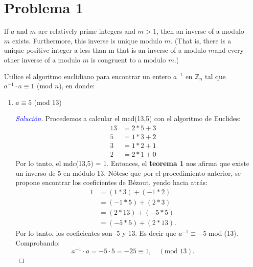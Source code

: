 \documentclass[a4paper,12pt]{article}
\newenvironment{solution}
  {\renewcommand\qedsymbol{$\square$}\begin{proof}[\textcolor{blue}{Solución}]}
  {\end{proof}}
\begin{document}
\section{Problema 1}
\begin{tcolorbox}[colback=gray!15,colframe=black!1!black,title=Teorema 1 - Sección 4.4 de \cite{rosen2012discrete}]
	If $a$ and $m$ are relatively prime integers and $m > 1$, then an inverse of a modulo $m$ exists. Furthermore, this inverse is unique modulo $m$. (That is, there is a unique positive integer a less than m that is an inverse of a modulo $m $and every other inverse of a modulo $m$ is congruent to a modulo $m$.)
	\end{tcolorbox}
Utilice el algoritmo euclidiano para encontrar un entero $a^{-1}$ en $\mathbb{Z}_n$ tal que $a^{-1}\cdot a \equiv 1$ (mod $n$), en donde:
\begin{enumerate}
	\item $a\equiv 5$ (mod 13) 
	\begin{solution}
		Procedemos a calcular el mcd(13,5) con el algoritmo de Euclides: 
		\begin{align*}
			13 &= 2*5+3\\
			5  &= 1*3 + 2\\ 
			3  &= 1*2 +1\\
			2 &= 2*1+0
		\end{align*}
	Por lo tanto, el mdc(13,5) = 1. Entonces, el \textbf{teorema 1} nos afirma que existe un inverso de 5 en módulo 13. Nótese que por el procedimiento anterior, se propone encontrar los coeficientes de Bézout, yendo hacia atrás:
\begin{align*}
	1	&=	(1 * 3) + (-1 * 2)\\
	&=	(-1 * 5) + (2 * 3)\\
	& =	(2 * 13) + (-5 * 5)\\
	&=	(-5 * 5) + (2 * 13).
\end{align*}
Por lo tanto, los coeficientes son -5  y 13. Es decir que $a^{-1}\equiv -5$ mod (13). Comprobando: 
$$a^{-1}\cdot a = -5\cdot 5 = -25 \equiv 1, \quad (\text{mod 13}).$$
	\end{solution}





\end{enumerate}
\end{document}
